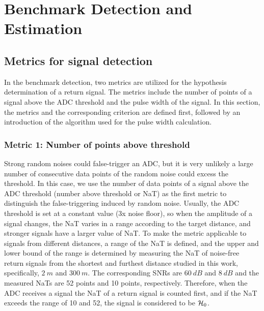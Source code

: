 \section{Benchmark Detection and Estimation}
\subsection{Metrics for signal detection}\label{sec:bm_metrics}
In the benchmark detection, two metrics are utilized for the hypothesis determination of a return signal. The metrics include the number of points of a signal above the ADC threshold and the pulse width of the signal. In this section, the metrics and the corresponding criterion are defined first, followed by an introduction of the algorithm used for the pulse width calculation.
\subsubsection{Metric 1: Number of points above threshold}
Strong random noises could false-trigger an ADC, but it is very unlikely a large number of consecutive data points of the random noise could excess the threshold. In this case, we use the number of data points of a signal above the ADC threshold (\abbr number above threshold or NaT) as the first metric to distinguish the false-triggering induced by random noise. Usually, the ADC threshold is set at a constant value (\ie 3x noise floor), so when the amplitude of a signal changes, the NaT varies in a range according to the target distance, and stronger signals have a larger value of NaT. To make the metric applicable to signals from different distances, a range of the NaT is defined, and the upper and lower bound of the range is determined by measuring the NaT of noise-free return signals from the shortest and furthest distance studied in this work, specifically, $2~m$ and $300~m$. The corresponding SNRs are $60~dB$ and $8~dB$ and the measured NaTs are 52 points and 10 points, respectively. Therefore, when the ADC receives a signal the NaT of a return signal is counted first, and if the NaT exceeds the range of 10 and 52, the signal is considered to be $\operatorname*{\mathcal{H}_0}$.
